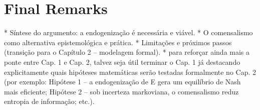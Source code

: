 
\section{Final Remarks}

* Síntese do argumento: a endogenização é necessária e viável. * O comensalismo como alternativa epistemológica e prática. * Limitações e próximos passos (transição para o Capítulo 2 – modelagem formal). * para reforçar ainda mais a ponte entre Cap. 1 e Cap. 2, talvez seja útil terminar o Cap. 1 já destacando explicitamente quais hipóteses matemáticas serão testadas formalmente no Cap. 2 (por exemplo: Hipótese 1 – a endogenização de E gera um equilíbrio de Nash mais eficiente; Hipótese 2 – sob incerteza markoviana, o comensalismo reduz entropia de informação; etc.).




